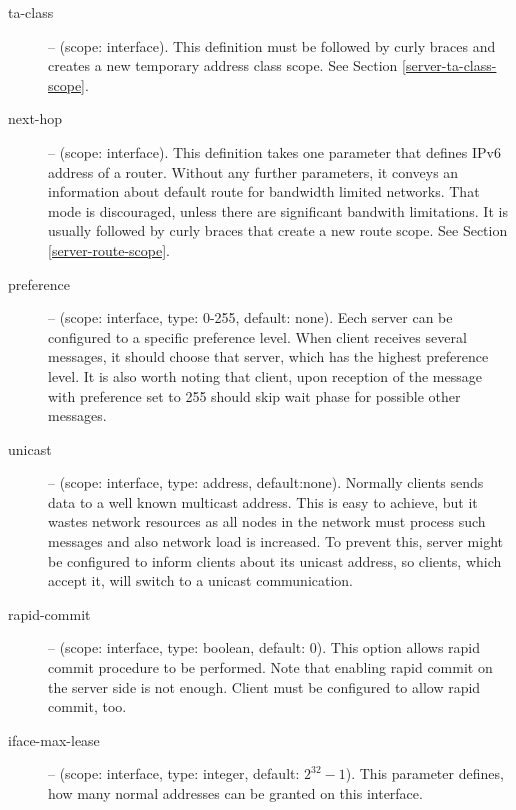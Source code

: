 \begin{description}
\item[ta-class] -- (scope: interface). This definition must be
followed by curly braces and creates a new temporary address class
scope. See Section \ref{server-ta-class-scope}.

\item[next-hop] -- (scope: interface). This definition takes one
parameter that defines IPv6 address of a router. Without any further
parameters, it conveys an information about default route for
bandwidth limited networks. That mode is discouraged, unless there are
significant bandwith limitations. It is usually followed by curly
braces that create a new route scope. See Section \ref{server-route-scope}.

 \item[preference] -- (scope: interface, type: 0-255, default:
            none). Eech server can be configured to a specific
            preference level. When client receives several
             messages, it should choose that server,
            which has the highest preference level. It is also worth
            noting that client, upon reception of the 
            message with preference set to 255 should skip wait phase
            for possible other  messages.


 \item[unicast] -- (scope: interface, type: address,
            default:none). Normally clients sends data to a well known
            multicast address. This is easy to achieve, but it wastes
            network resources as all nodes in the network must process
            such messages and also network load is increased. To prevent
            this, server might be configured to inform clients about its
            unicast address, so clients, which accept it, will switch to
            a unicast communication.

 \item[rapid-commit] -- (scope: interface, type: boolean, default:
            0). This option allows rapid commit procedure to be
            performed. Note that enabling rapid commit on the server
            side is not enough. Client must be configured to allow
            rapid commit, too.

\item[iface-max-lease] -- (scope: interface, type: integer, default:
            $2^{32}-1$). This parameter defines, how many normal
            addresses can be granted on this interface.


\end{description}
